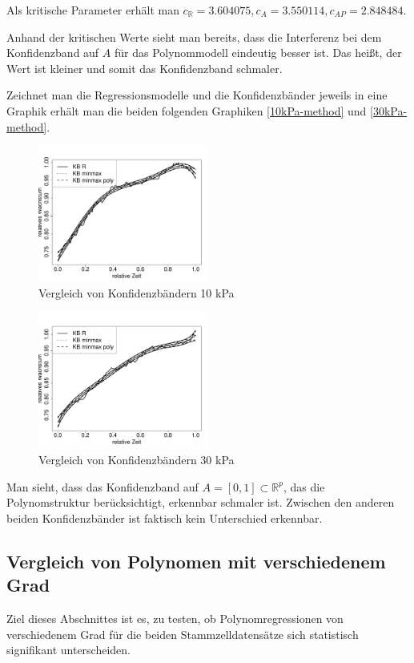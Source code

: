\documentclass[12pt,a4paper]{article}
\theoremstyle{definition}
\theoremstyle{definition}
\theoremstyle{definition}
\theoremstyle{definition}
\begin{document}
Als kritische Parameter erhält man $c_{\mathbb{R}} = 3.604075, c_{A} = 3.550114, c_{AP} = 2.848484 $. 

Anhand der kritischen Werte sieht man bereits, dass die Interferenz bei dem Konfidenzband auf $A$ für das Polynommodell eindeutig besser ist. Das heißt, der Wert ist kleiner und somit das Konfidenzband schmaler.

Zeichnet man die Regressionsmodelle und die Konfidenzbänder jeweils in eine Graphik erhält man die beiden folgenden Graphiken \eqref{10kPa-method} und \eqref{30kPa-method}.

\begin{figure}[H] 
  \centering
     \includegraphics[width=0.5\textwidth]{10kPa-method.pdf}
  \caption{Vergleich von Konfidenzbändern 10 kPa}
  \label{10kPa-method}
\end{figure}

\begin{figure}[H] 
  \centering
     \includegraphics[width=0.5\textwidth]{30kPa-method.pdf}
  \caption{Vergleich von Konfidenzbändern 30 kPa}
  \label{30kPa-method}
\end{figure} 

Man sieht, dass  das Konfidenzband auf $A = [0,1] \subset \mathbb{R}^{p}$, das die Polynomstruktur berücksichtigt, erkennbar schmaler ist. Zwischen den anderen beiden Konfidenzbänder ist faktisch kein Unterschied erkennbar.




\subsection{Vergleich von Polynomen mit verschiedenem Grad}
Ziel dieses Abschnittes ist es, zu testen, ob Polynomregressionen von verschiedenem Grad für die beiden Stammzelldatensätze sich statistisch signifikant unterscheiden.
\end{document}
